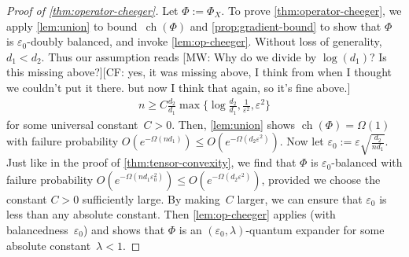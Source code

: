 \documentclass[aos]{imsart}
\theoremstyle{definition}
\numberwithin{equation}{section}
\DeclareMathOperator{\ch}{ch}
\newcommand{\eps}{\varepsilon}
\newcommand{\CF}[1]{{\color{purple}[CF: #1]}}
\newcommand{\MW}[1]{{\color{red}[MW: #1]}}
\newcommand{\CF}[1]{{}}
\newcommand{\MW}[1]{{}}
\begin{document}
\begin{appendix}
\begin{proof}[Proof of \cref{thm:operator-cheeger}]
Let $\Phi:=\Phi_X$.
To prove \cref{thm:operator-cheeger}, we apply \cref{lem:union} to bound~$\ch(\Phi)$ and \cref{prop:gradient-bound} to show that $\Phi$ is $\eps_0$-doubly balanced, and invoke \cref{lem:op-cheeger}.
Without loss of generality, $d_1 < d_2$.
Thus our assumption reads
\MW{Why do we divide by $\log(d_1)$? Is this missing above?}\CF{yes, it was missing above, I think from when I thought we couldn't put it there. but now I think that again, so it's fine above.}
\begin{align*}
  n \geq C \frac{d_2}{d_1} \max\{\log \frac{d_2}{d_1}, \frac1{\eps^2}, \eps^2 \}
\end{align*}
for some universal constant~$C>0$.
Then, \cref{lem:union} shows $\ch(\Phi) = \Omega(1)$ with failure probability $O(e^{- \Omega(n d_1)}) \leq O(e^{- \Omega(d_2 \eps^2)})$.
Now let $\eps_0 := \eps \sqrt{\frac{d_2}{n d_1}}$.
Just like in the proof of \cref{thm:tensor-convexity}, we find that $\Phi$ is $\eps_0$-balanced with failure probability $O(e^{-\Omega(n d_1 \eps_0^2)}) \leq O(e^{-\Omega(d_2 \eps^2)})$, provided we choose the constant $C>0$ sufficiently large.
By making~$C$ larger, we can ensure that $\eps_0$ is less than any absolute constant.
Then \cref{lem:op-cheeger} applies (with balancedness~$\eps_0$) and shows that $\Phi$ is an $(\eps_0,\lambda)$-quantum expander for some absolute constant~$\lambda<1$.
\end{proof}


\end{appendix}
\end{document}
